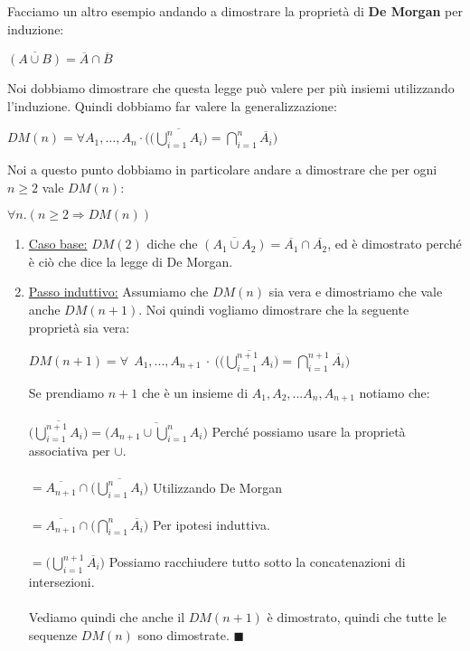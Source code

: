 \begin{example}[De Morgan]
    Facciamo un altro esempio andando a dimostrare la proprietà di \textbf{De Morgan} per induzione:
    \begin{center}
        $\overline{(A \cup B)} = \overline{A} \cap \overline{B}$
    \end{center}
    Noi dobbiamo dimostrare che questa legge può valere per più insiemi utilizzando l'induzione. Quindi dobbiamo far valere la generalizzazione:
    \begin{center}
        $DM(n) = \forall A_1, \ldots , A_n \cdot \Bigg(\overline{\Big( \bigcup\limits_{i=1}^{n} A_i \Big)} = \bigcap\limits_{i=1}^{n}\overline{A_i} \Bigg)$
    \end{center}
    Noi a questo punto dobbiamo in particolare andare a dimostrare che per ogni $n \geq 2$ vale $DM(n)$:
    \begin{center}
        $\forall n . (n \geq 2 \Longrightarrow DM(n))$
    \end{center}
    \begin{enumerate}
        \item \underline{Caso base:} $DM(2)$ diche che $\overline{(A_1 \cup A_2)} = \overline{A_1} \cap \overline{A_2}$, ed è dimostrato perché è ciò che dice la legge di De Morgan.
        \item \underline{Passo induttivo:} Assumiamo che $DM(n)$ sia vera e dimostriamo che vale anche $DM(n+1)$. Noi quindi vogliamo dimostrare che la seguente proprietà sia vera:
        \begin{center}
            $DM(n+1) = \forall \: \: A_1, ..., A_{n+1} \: \cdot \: \Bigg(\overline{\Big( \bigcup\limits_{i=1}^{n+1} A_i \Big)} = \bigcap\limits_{i=1}^{n+1}\overline{A_i} \Bigg)$
        \end{center}
        Se prendiamo $n+1$ che è un insieme di $A_1, A_2, ...A_n, A_{n+1}$ notiamo che:\\ \\
        $\overline{\Big( \bigcup\limits_{i=1}^{n+1} A_i \Big)} = \overline{\Big(A_{n+1} \cup \bigcup\limits_{i=1}^{n} A_i \Big)}$ \hspace{.5cm} Perché possiamo usare la proprietà associativa per $\cup$.\\ \\
        $= \overline{A_{n+1}} \cap \overline{\Big(\bigcup\limits_{i=1}^{n} A_i \Big)}$ \hspace{.5cm} Utilizzando De Morgan\\\\
        $= \overline{A_{n+1}} \cap \Big(\bigcap\limits_{i=1}^{n} \overline{A_i} \Big)$ \hspace{.5cm} Per ipotesi induttiva.\\\\
        $= \Big(\bigcup\limits_{i=1}^{n+1} \overline{A_i} \Big)$ \hspace{.5cm} Possiamo racchiudere tutto sotto la concatenazioni di intersezioni. \\ \\
        Vediamo quindi che anche il $DM(n+1)$ è dimostrato, quindi che tutte le sequenze $DM(n)$ sono dimostrate. \: \: $\blacksquare$
    \end{enumerate}
\end{example}
